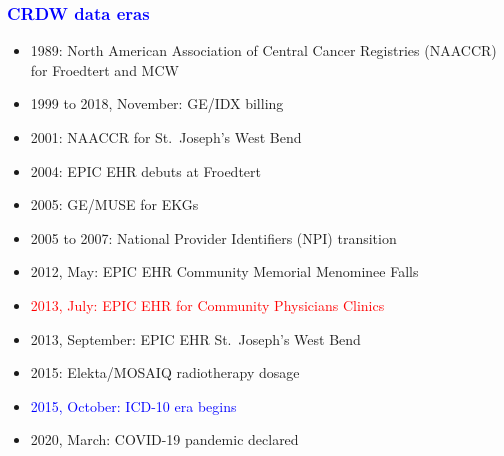 \documentclass[11pt,pdftex,dvipsnames,usenames]{beamer}
\begin{document}
\begin{frame}[fragile]\frametitle{\bf\textcolor{blue}{CRDW data eras}}

\begin{itemize}
\item 1989: North American Association of Central Cancer Registries
  (NAACCR) for Froedtert and MCW
\item 1999 to 2018, November: GE/IDX billing
\item 2001: NAACCR for St.\ Joseph's West Bend
\item 2004: EPIC EHR debuts at Froedtert
\item 2005: GE/MUSE for EKGs
\item 2005 to 2007: National Provider Identifiers (NPI) transition
\item 2012, May: EPIC EHR Community Memorial Menominee Falls
\item \textcolor{red}{2013, July: EPIC EHR for Community Physicians Clinics} 
\item 2013, September: EPIC EHR St.\ Joseph's West Bend
\item 2015: Elekta/MOSAIQ radiotherapy dosage
\item \textcolor{blue}{2015, October: ICD-10 era begins}
\item 2020, March: COVID-19 pandemic declared
\end{itemize}

\end{frame}
\end{document}
